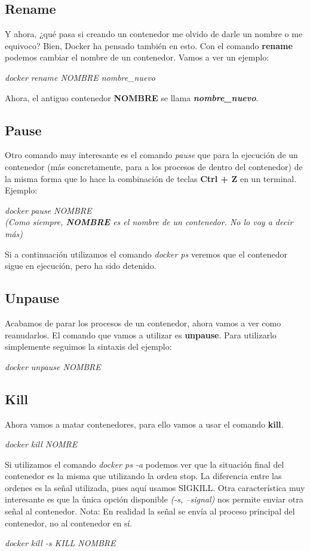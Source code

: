 \documentclass[]{article}
\begin{document}
\subsection{Rename}
Y ahora, ¿qué pasa si creando un contenedor me olvido de darle un nombre o me equivoco?
Bien, Docker ha pensado también en esto. Con el comando {\bf rename} podemos cambiar el nombre de un contenedor.
Vamos a ver un ejemplo:
\begin{center}
\it
docker rename NOMBRE nombre\_nuevo

\end{center}
Ahora, el antiguo contenedor {\bf NOMBRE} se llama \textbf{\textit {nombre\_nuevo}}.

\subsection{Pause}
Otro comando muy interesante es el comando {\it pause} que para la ejecución de un contenedor (más concretamente, para a los procesos de dentro del contenedor) de la misma forma que lo hace la combinación
de teclas {\bf Ctrl + Z} en un terminal.
Ejemplo:
\begin{center}
	\it
	docker pause NOMBRE
	\\
	\vspace{1mm}
	(Como siempre, \textbf{NOMBRE} es el nombre de un contenedor. No lo voy a decir más)
\end{center}
Si a continuación utilizamos el comando {\it docker ps} veremos que el contenedor sigue en ejecución, pero ha sido detenido.

\subsection{Unpause}
Acabamos de parar los procesos de un contenedor, ahora vamos a ver como reanudarlos.
El comando que vamos a utilizar es \textbf{unpause}.
Para utilizarlo simplemente seguimos la sintaxis del ejemplo:
\begin{center}
	\it docker unpause NOMBRE
\end{center}

\subsection{Kill}
Ahora vamos a matar contenedores, para ello vamos a usar el comando \textbf{kill}.
\begin{center}
	\textit{docker kill NOMRE}
\end{center}
Si utilizamos el comando \textit{docker ps -a} podemos ver que la situación final del contenedor es la misma que utilizando la orden stop.
La diferencia entre las ordenes es la señal utilizada, pues aquí usamos SIGKILL.
Otra característica muy interesante es que la única opción disponible \textit{(-s, --signal)} nos permite enviar otra señal al contenedor.
\hspace{1cm} Nota: En realidad la señal se envía al proceso principal del contenedor, no al contenedor en sí.
\begin{center}
	\it
	docker kill -s KILL NOMBRE
\end{center}
\end{document}
